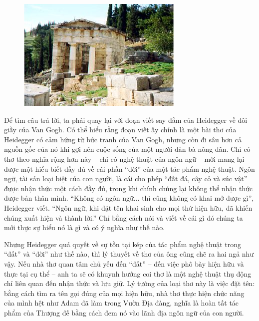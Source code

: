 \documentclass[../main.tex]{subfiles}
\begin{document}
\begin{multicols}{2}
\begin{figure}
	\centering
	\includegraphics[width=\textwidth]{../img/tho060508_2.jpg}
	\caption{}
\end{figure}
 Để tìm câu trả lời, ta phải quay lại với đoạn viết say đắm của Heidegger về đôi giầy của Van Gogh. Có thể hiểu rằng đoạn viết ấy chính là một bài thơ của Heidegger có cảm hứng từ bức tranh của Van Gogh, nhưng còn đi sâu hơn cả nguồn gốc của nó khi gợi nên cuộc sống của một người đàn bà nông dân. Chỉ có thơ theo nghĩa rộng hơn này – chỉ có nghệ thuật của ngôn ngữ – mới mang lại được một hiểu biết đầy đủ về cái phần “đời” của một tác phẩm nghệ thuật. Ngôn ngữ, tài sản loại biệt của con người, là cái cho phép “đất đá, cây cỏ và súc vật” được nhận thức một cách đầy đủ, trong khi chính chúng lại không thể nhận thức được bản thân mình. “Không có ngôn ngữ... thì cũng không có khai mở được gì”, Heidegger viết. “Ngôn ngữ, khi đặt tên khai sinh cho mọi thứ hiện hữu, đã khiến chúng xuất hiện và thành lời.” Chỉ bằng cách nói và viết về cái gì đó chúng ta mới thực sự hiểu nó là gì và có ý nghĩa như thế nào. 

Nhưng Heidegger quả quyết về sự tồn tại kép của tác phẩm nghệ thuật trong “đất” và “đời” như thế nào, thì lý thuyết về thơ của ông cũng chẽ ra hai ngả như vậy. Nếu nhà thơ quan tâm chủ yếu đến “đất” – đến việc phô bày hiện hữu và thực tại cụ thể – anh ta sẽ có khuynh hướng coi thơ là một nghệ thuật thụ động chỉ liên quan đến nhận thức và lưu giữ. Lý tưởng của loại thơ này là việc đặt tên: bằng cách tìm ra tên gọi đúng của mọi hiện hữu, nhà thơ thực hiện chức năng của mình hệt như Adam đã làm trong Vườn Địa đàng, nghĩa là hoàn tất tác phẩm của Thượng đế bằng cách đem nó vào lãnh địa ngôn ngữ của con người. 


\end{multicols}
\end{document}
